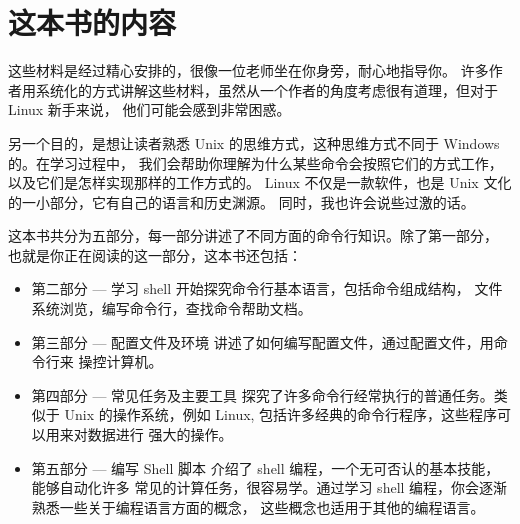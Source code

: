 \section{这本书的内容} %
\label{sec:这本书的内容}

这些材料是经过精心安排的，很像一位老师坐在你身旁，耐心地指导你。 许多作者用系统化的方式讲解这些材料，虽然从一个作者的角度考虑很有道理，但对于 Linux 新手来说， 他们可能会感到非常困惑。

\par 另一个目的，是想让读者熟悉 Unix 的思维方式，这种思维方式不同于 Windows 的。在学习过程中， 我们会帮助你理解为什么某些命令会按照它们的方式工作，以及它们是怎样实现那样的工作方式的。 Linux 不仅是一款软件，也是 Unix 文化的一小部分，它有自己的语言和历史渊源。 同时，我也许会说些过激的话。

\par 这本书共分为五部分，每一部分讲述了不同方面的命令行知识。除了第一部分， 也就是你正在阅读的这一部分，这本书还包括：
\begin{itemize}
	\item 第二部分 — 学习 shell 开始探究命令行基本语言，包括命令组成结构， 文件系统浏览，编写命令行，查找命令帮助文档。
	\item 第三部分 — 配置文件及环境 讲述了如何编写配置文件，通过配置文件，用命令行来 操控计算机。
	\item 第四部分 — 常见任务及主要工具 探究了许多命令行经常执行的普通任务。类似于 Unix 的操作系统，例如 Linux, 包括许多经典的命令行程序，这些程序可以用来对数据进行 强大的操作。
	\item 第五部分 — 编写 Shell 脚本 介绍了 shell 编程，一个无可否认的基本技能，能够自动化许多 常见的计算任务，很容易学。通过学习 shell 编程，你会逐渐熟悉一些关于编程语言方面的概念， 这些概念也适用于其他的编程语言。
\end{itemize}






